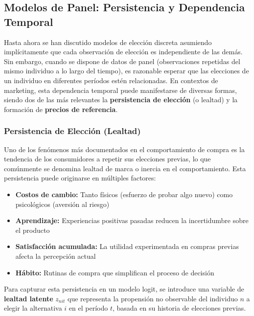 \documentclass[
]{book}
\providecommand{\tightlist}{%
  \setlength{\itemsep}{0pt}\setlength{\parskip}{0pt}}
\begin{document}
\subsection{Modelos de Panel: Persistencia y Dependencia Temporal}\label{modelos-de-panel-persistencia-y-dependencia-temporal}

Hasta ahora se han discutido modelos de elección discreta asumiendo implícitamente que cada observación de elección es independiente de las demás. Sin embargo, cuando se dispone de datos de panel (observaciones repetidas del mismo individuo a lo largo del tiempo), es razonable esperar que las elecciones de un individuo en diferentes períodos estén relacionadas. En contextos de marketing, esta dependencia temporal puede manifestarse de diversas formas, siendo dos de las más relevantes la \textbf{persistencia de elección} (o lealtad) y la formación de \textbf{precios de referencia}.

\subsubsection{Persistencia de Elección (Lealtad)}\label{persistencia-de-elecciuxf3n-lealtad}

Uno de los fenómenos más documentados en el comportamiento de compra es la tendencia de los consumidores a repetir sus elecciones previas, lo que comúnmente se denomina lealtad de marca o inercia en el comportamiento. Esta persistencia puede originarse en múltiples factores:

\begin{itemize}
\tightlist
\item
  \textbf{Costos de cambio:} Tanto físicos (esfuerzo de probar algo nuevo) como psicológicos (aversión al riesgo)
\item
  \textbf{Aprendizaje:} Experiencias positivas pasadas reducen la incertidumbre sobre el producto
\item
  \textbf{Satisfacción acumulada:} La utilidad experimentada en compras previas afecta la percepción actual
\item
  \textbf{Hábito:} Rutinas de compra que simplifican el proceso de decisión
\end{itemize}

Para capturar esta persistencia en un modelo logit, se introduce una variable de \textbf{lealtad latente} \(z_{nit}\) que representa la propensión no observable del individuo \(n\) a elegir la alternativa \(i\) en el período \(t\), basada en su historia de elecciones previas.
\end{document}
